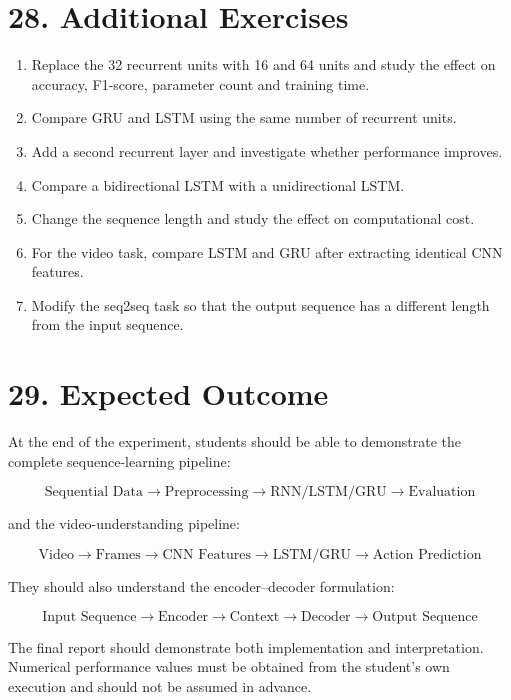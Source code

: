 \documentclass[10pt]{article}
\begin{document}
\section*{28. Additional Exercises}

\begin{enumerate}
\item Replace the 32 recurrent units with 16 and 64 units and study the effect
on accuracy, F1-score, parameter count and training time.
\item Compare GRU and LSTM using the same number of recurrent units.
\item Add a second recurrent layer and investigate whether performance improves.
\item Compare a bidirectional LSTM with a unidirectional LSTM.
\item Change the sequence length and study the effect on computational cost.
\item For the video task, compare LSTM and GRU after extracting identical CNN
features.
\item Modify the seq2seq task so that the output sequence has a different
length from the input sequence.
\end{enumerate}

\section*{29. Expected Outcome}

At the end of the experiment, students should be able to demonstrate the
complete sequence-learning pipeline:

\[
\boxed{
\text{Sequential Data}
\rightarrow
\text{Preprocessing}
\rightarrow
\text{RNN/LSTM/GRU}
\rightarrow
\text{Evaluation}
}
\]

and the video-understanding pipeline:

\[
\boxed{
\text{Video}
\rightarrow
\text{Frames}
\rightarrow
\text{CNN Features}
\rightarrow
\text{LSTM/GRU}
\rightarrow
\text{Action Prediction}
}
\]

They should also understand the encoder--decoder formulation:

\[
\boxed{
\text{Input Sequence}
\rightarrow
\text{Encoder}
\rightarrow
\text{Context}
\rightarrow
\text{Decoder}
\rightarrow
\text{Output Sequence}
}
\]

The final report should demonstrate both implementation and interpretation.
Numerical performance values must be obtained from the student's own
execution and should not be assumed in advance.
\end{document}
